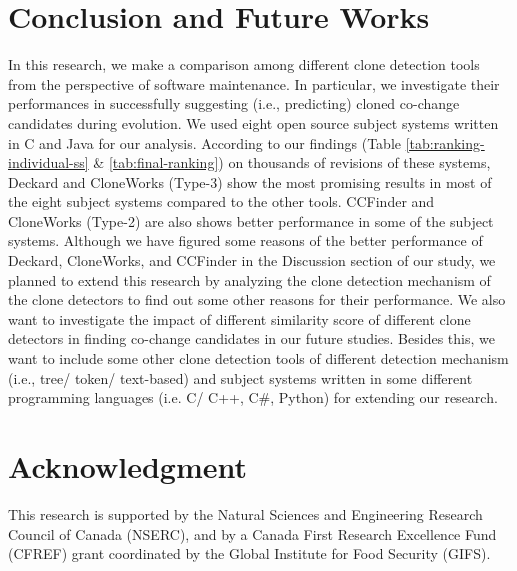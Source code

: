 \documentclass[review]{elsarticle}
\begin{document}
\vspace{2mm}
\section{Conclusion and Future Works}
\label{the-conclusion-future-works}
In this research, we make a comparison among different clone detection tools from the perspective of software maintenance. In particular, we investigate their performances in successfully suggesting (i.e., predicting) cloned co-change candidates during evolution. We used eight open source subject systems written in C and Java for our analysis. According to our findings (Table \ref{tab:ranking-individual-ss} \& \ref{tab:final-ranking}) on thousands of revisions of these systems, Deckard and CloneWorks (Type-3) show the most promising results in most of the eight subject systems compared to the other tools. CCFinder and CloneWorks (Type-2) are also shows better performance in some of the subject systems. Although we have figured some reasons of the better performance of Deckard, CloneWorks, and CCFinder in the Discussion section of our study, we planned to extend this research by analyzing the clone detection mechanism of the clone detectors to find out some other reasons for their performance. We also want to investigate the impact of different similarity score of different clone detectors in finding co-change candidates in our future studies. Besides this, we want to include some other clone detection tools of different detection mechanism (i.e., tree/ token/ text-based) and subject systems written in some different programming languages (i.e. C/ C++, C\#, Python) for extending our research. %

\section*{Acknowledgment}
This research is supported by the Natural Sciences and Engineering Research Council of Canada (NSERC), and by a Canada First Research Excellence Fund (CFREF) grant coordinated by the Global Institute for Food Security (GIFS).


\end{document}
